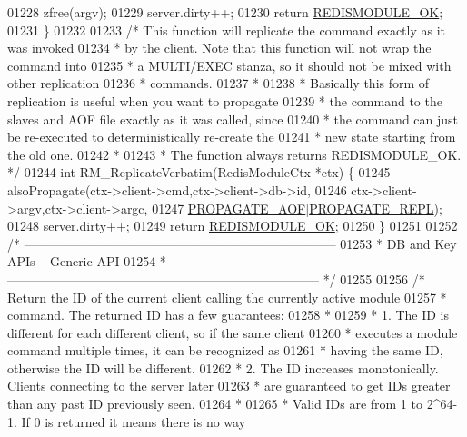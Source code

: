 \begin{DoxyCode}
{{{01228     zfree(argv);
01229     server.dirty++;
01230     \textcolor{keywordflow}{return} \hyperlink{redismodule_8h_a1bc5bfd69abcd378ff52c640adc5418d}{REDISMODULE\_OK};
01231 \}
01232 
01233 \textcolor{comment}{/* This function will replicate the command exactly as it was invoked}
01234 \textcolor{comment}{ * by the client. Note that this function will not wrap the command into}
01235 \textcolor{comment}{ * a MULTI/EXEC stanza, so it should not be mixed with other replication}
01236 \textcolor{comment}{ * commands.}
01237 \textcolor{comment}{ *}
01238 \textcolor{comment}{ * Basically this form of replication is useful when you want to propagate}
01239 \textcolor{comment}{ * the command to the slaves and AOF file exactly as it was called, since}
01240 \textcolor{comment}{ * the command can just be re-executed to deterministically re-create the}
01241 \textcolor{comment}{ * new state starting from the old one.}
01242 \textcolor{comment}{ *}
01243 \textcolor{comment}{ * The function always returns REDISMODULE\_OK. */}
01244 \textcolor{keywordtype}{int} RM\_ReplicateVerbatim(RedisModuleCtx *ctx) \{
01245     alsoPropagate(ctx->client->cmd,ctx->client->db->id,
01246         ctx->client->argv,ctx->client->argc,
01247         \hyperlink{server_8h_a542fb79924ca427c866fd63632f60777}{PROPAGATE\_AOF}|\hyperlink{server_8h_a59c6e025b4ed85642a0472fc3e73e298}{PROPAGATE\_REPL});
01248     server.dirty++;
01249     \textcolor{keywordflow}{return} \hyperlink{redismodule_8h_a1bc5bfd69abcd378ff52c640adc5418d}{REDISMODULE\_OK};
01250 \}
01251 
01252 \textcolor{comment}{/* --------------------------------------------------------------------------}
01253 \textcolor{comment}{ * DB and Key APIs -- Generic API}
01254 \textcolor{comment}{ * -------------------------------------------------------------------------- */}
01255 
01256 \textcolor{comment}{/* Return the ID of the current client calling the currently active module}
01257 \textcolor{comment}{ * command. The returned ID has a few guarantees:}
01258 \textcolor{comment}{ *}
01259 \textcolor{comment}{ * 1. The ID is different for each different client, so if the same client}
01260 \textcolor{comment}{ *    executes a module command multiple times, it can be recognized as}
01261 \textcolor{comment}{ *    having the same ID, otherwise the ID will be different.}
01262 \textcolor{comment}{ * 2. The ID increases monotonically. Clients connecting to the server later}
01263 \textcolor{comment}{ *    are guaranteed to get IDs greater than any past ID previously seen.}
01264 \textcolor{comment}{ *}
01265 \textcolor{comment}{ * Valid IDs are from 1 to 2^64-1. If 0 is returned it means there is no way}
}}}
\end{DoxyCode}

